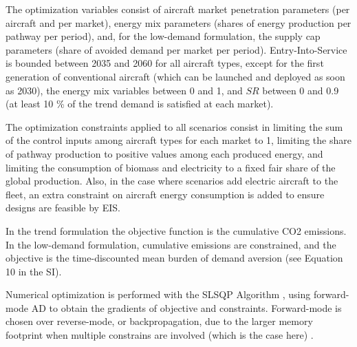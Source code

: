 \documentclass[a4paper,fleqn]{cas-dc}
\begin{document}
The optimization variables consist of aircraft market penetration parameters (per aircraft and per market), energy mix parameters (shares of energy production per pathway per period), and, for the low-demand formulation, the supply cap parameters (share of avoided demand per market per period). Entry-Into-Service is bounded between 2035 and 2060 for all aircraft types, except for the first generation of conventional aircraft (which can be launched and deployed as soon as 2030), the energy mix variables between 0 and 1, and $SR$ between 0 and 0.9 (at least 10 \% of the trend demand is satisfied at each market).

The optimization constraints applied to all scenarios consist in limiting the sum of the control inputs among aircraft types for each market to 1, limiting the share of pathway production to positive values among each produced energy, and limiting the consumption of biomass and electricity to a fixed fair share of the global production. Also, in the case where scenarios add electric aircraft to the fleet, an extra constraint on aircraft energy consumption is added to ensure designs are feasible by EIS.

In the trend formulation the objective function is the cumulative CO2 emissions. In the low-demand formulation, cumulative emissions are constrained, and the objective is the time-discounted mean burden of demand aversion (see Equation 10 in the SI).

Numerical optimization is performed with the SLSQP Algorithm \cite{kraft1988software}, using forward-mode AD to obtain the gradients of objective and constraints. Forward-mode is chosen over reverse-mode, or backpropagation, due to the larger memory footprint when multiple constrains are involved (which is the case here) \cite{blondel2024}.
\end{document}
